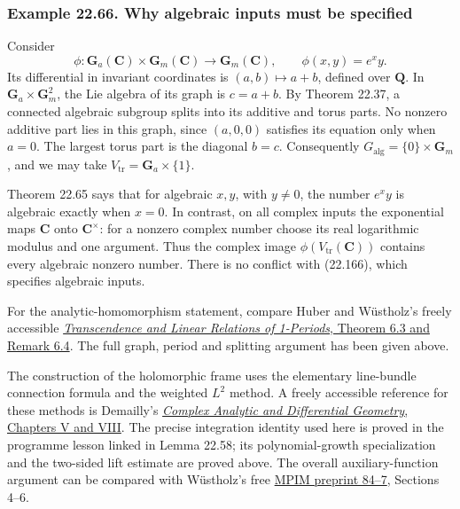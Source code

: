 \documentclass[
  11pt,
  a4paper,
]{article}
\begin{document}
\subsubsection{Example 22.66. Why algebraic inputs must be
specified}\label{example-22.66.-why-algebraic-inputs-must-be-specified}

Consider \[
 \phi:\mathbf G_a(\mathbf C)\times\mathbf G_m(\mathbf C)
       \longrightarrow\mathbf G_m(\mathbf C),\qquad
 \phi(x,y)=e^x y.
 \tag{22.168}
\] Its differential in invariant coordinates is \((a,b)\mapsto a+b\),
defined over \(\mathbf Q\). In \(\mathbf G_a\times\mathbf G_m^2\), the
Lie algebra of its graph is \(c=a+b\). By Theorem 22.37, a connected
algebraic subgroup splits into its additive and torus parts. No nonzero
additive part lies in this graph, since \((a,0,0)\) satisfies its
equation only when \(a=0\). The largest torus part is the diagonal
\(b=c\). Consequently \(G_{\mathrm{alg}}=\{0\}\times\mathbf G_m\), and
we may take \(V_{\mathrm{tr}}=\mathbf G_a\times\{1\}\).

Theorem 22.65 says that for algebraic \(x,y\), with \(y\ne0\), the
number \(e^x y\) is algebraic exactly when \(x=0\). In contrast, on all
complex inputs the exponential maps \(\mathbf C\) onto
\(\mathbf C^\times\): for a nonzero complex number choose its real
logarithmic modulus and one argument. Thus the complex image
\(\phi(V_{\mathrm{tr}}(\mathbf C))\) contains every algebraic nonzero
number. There is no conflict with (22.166), which specifies algebraic
inputs.

For the analytic-homomorphism statement, compare Huber and Wüstholz's
freely accessible
\href{https://home.mathematik.uni-freiburg.de/arithgeom/preprints/huber-einsmotive.pdf}{\emph{Transcendence
and Linear Relations of 1-Periods}, Theorem 6.3 and Remark 6.4}. The
full graph, period and splitting argument has been given above.

The construction of the holomorphic frame uses the elementary
line-bundle connection formula and the weighted \(L^2\) method. A freely
accessible reference for these methods is Demailly's
\href{https://www-fourier.univ-grenoble-alpes.fr/~demailly/manuscripts/agbook.pdf}{\emph{Complex
Analytic and Differential Geometry}, Chapters V and VIII}. The precise
integration identity used here is proved in the programme lesson linked
in Lemma 22.58; its polynomial-growth specialization and the two-sided
lift estimate are proved above. The overall auxiliary-function argument
can be compared with Wüstholz's free
\href{https://archive.mpim-bonn.mpg.de/id/eprint/3829/1/preprint_1984_7.pdf}{MPIM
preprint 84--7}, Sections 4--6.
\end{document}
